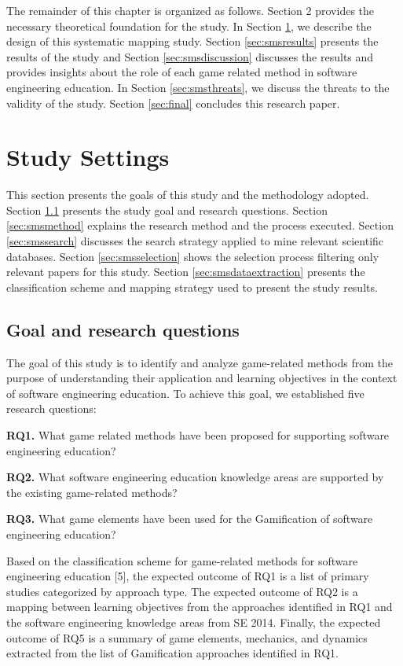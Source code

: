 The remainder of this chapter is organized as follows. Section 2 provides the necessary theoretical foundation for the study. In Section \ref{sec:smsstudySettings}, we describe the design of this systematic mapping study. Section \ref{sec:smsresults} presents the results of the study and Section \ref{sec:smsdiscussion} discusses the results and provides insights about the role of each game related method in software engineering education. In Section \ref{sec:smsthreats}, we discuss the threats to the validity of the study. Section \ref{sec:final} concludes this research paper.



\section{Study Settings}
\label{sec:smsstudySettings}

This section presents the goals of this study and the methodology adopted. Section \ref{sec:smsgoals} presents the study goal and research questions. Section \ref{sec:smsmethod} explains the research method and the process executed. Section \ref{sec:smssearch} discusses the search strategy applied to mine relevant scientific databases. Section \ref{sec:smsselection} shows the selection process filtering only relevant papers for this study. Section \ref{sec:smsdataextraction} presents the classification scheme and mapping strategy used to present the study results.

\subsection{Goal and research questions}
\label{sec:smsgoals}

The goal of this study is to identify and analyze game-related methods from the purpose of understanding their application and learning objectives in the context of software engineering education. To achieve this goal, we established five research questions:

\textbf{RQ1.} What game related methods have been proposed for supporting software engineering education?

\textbf{RQ2.} What software engineering education knowledge areas are supported by the existing game-related methods?

\textbf{RQ3.} What game elements have been used for the Gamification of software engineering education? 

Based on the classification scheme for game-related methods for software engineering education [5], the expected outcome of RQ1 is a list of primary studies categorized by approach type. The expected outcome of RQ2 is a mapping between learning objectives from the approaches identified in RQ1 and the software engineering knowledge areas from SE 2014. Finally, the expected outcome of RQ5 is a summary of game elements, mechanics, and dynamics extracted from the list of Gamification approaches identified in RQ1.

